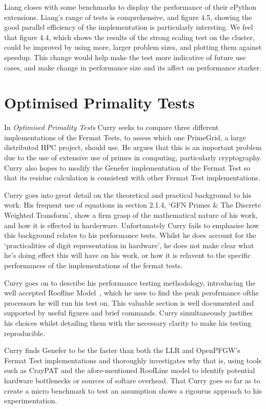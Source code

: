 \documentclass{report}
\begin{document}
 Liang closes with some benchmarks to display the performance of their ePython extensions. Liang's range of tests is comprehensive, and figure 4.5, showing the good parallel efficiency of the implementation is particularly intersting. We feel that figure 4.4, which shows the results of the strong scaling test on the cluster, could be improved by using more, larger problem sizes, and plotting them against speedup. This change would help make the test more indicative of future use cases, and make change in performance size and its affect on performance starker.

\section{Optimised Primality Tests}

In \textit{Optimised Primality Tests} Curry seeks to compare three different implementations of the Fermat Tests, to assess which one PrimeGrid, a large distributed HPC project, should use. He argues that this is an important problem due to the use of extensive use of primes in computing, particularly cryptography. Curry also hopes to modify the Genefer implementation of the Fermat Test so that its residue calculation is consistent with other Fermat Test implementations.

Curry goes into great detail on the theoretical and practical background to his work. His frequent use of equations in section 2.1.4, `GFN Primes \& The Discrete Weighted Transform', show a firm grasp of the mathematical nature of his work, and how it is effected in harderware. Unfortunately Curry fails to emphasise how this background relates to his performance tests.  Whilst he does account for the `practicalities of digit representation in hardware', he does not make clear what he's doing effect this will have on his work, or how it is relavent to the specific performances of the implementations of the fermat tests.

Curry goes on to describe his performance testing  methodology, introducing the well accepted Roofline Model~\cite{williams2009}\cite{hennessy2011computer}\cite{asanovic2009view}, which he uses to find the peak perofrmance ofthe processors he will run his test on. This valuable section is well documented and supported by useful figures and brief commands. Curry simultaneously justifies his choices whilst detailing them with the necessary clarity to make his testing reproducible.

Curry finds Genefer to be the faster than both the LLR and OpenPFGW's Fermat Test implementations and thoroughly investigates why that is, using tools such as CrayPAT and the afore-mentioned RoofLine model to identify potential hardware bottlenecks or sources of softare overhead. That Curry goes so far as to create a micro benchmark to test an assumption shows a rigourus approach to his experimentation.
\end{document}
